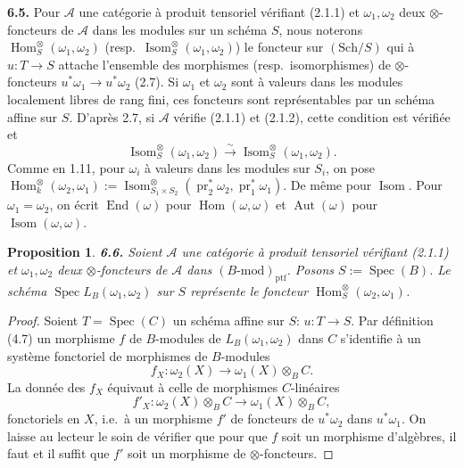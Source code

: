 \documentclass[12pt,a4paper]{article}
\theoremstyle{plain}
\newtheorem{proposition}[theorem]{Proposition}
\theoremstyle{definition}
\theoremstyle{remark}
\DeclareMathOperator{\Hom}{Hom}
\DeclareMathOperator{\End}{End}
\DeclareMathOperator{\Aut}{Aut}
\DeclareMathOperator{\Isom}{Isom}
\DeclareMathOperator{\Spec}{Spec}
\DeclareMathOperator{\pr}{pr}
\begin{document}
\textbf{6.5.} Pour $\mathcal{A}$ une catégorie à produit tensoriel vérifiant (2.1.1) et $\omega_1, \omega_2$ deux $\otimes$-foncteurs de $\mathcal{A}$ dans les modules sur un schéma $S$, nous noterons $\Hom^\otimes_S(\omega_1,\omega_2)$ (resp.~$\Isom^\otimes_S(\omega_1,\omega_2)$) le foncteur sur $(\mathrm{Sch}/S)$ qui à $u : T \to S$ attache l'ensemble des morphismes (resp.~isomorphismes) de $\otimes$-foncteurs $u^*\omega_1 \to u^*\omega_2$ (2.7). Si $\omega_1$ et $\omega_2$ sont à valeurs dans les modules localement libres de rang fini, ces foncteurs sont représentables par un schéma affine sur $S$. D'après 2.7, si $\mathcal{A}$ vérifie (2.1.1) et (2.1.2), cette condition est vérifiée et
\[
\Isom^\otimes_S(\omega_1,\omega_2) \xrightarrow{\sim} \Isom^\otimes_S(\omega_1,\omega_2).
\]
Comme en 1.11, pour $\omega_i$ à valeurs dans les modules sur $S_i$, on pose $\Hom^\otimes_k(\omega_2,\omega_1) := \Isom^\otimes_{S_1 \times S_2}(\pr_2^*\omega_2, \pr_1^*\omega_1)$. De même pour $\Isom$. Pour $\omega_1 = \omega_2$, on écrit $\End(\omega)$ pour $\Hom(\omega,\omega)$ et $\Aut(\omega)$ pour $\Isom(\omega,\omega)$.

\begin{proposition}\label{prop:6.6}
\textbf{6.6.} Soient $\mathcal{A}$ une catégorie à produit tensoriel vérifiant (2.1.1) et $\omega_1, \omega_2$ deux $\otimes$-foncteurs de $\mathcal{A}$ dans $(B\text{-mod})_\mathrm{ptf}$. Posons $S := \Spec(B)$. Le schéma $\Spec L_B(\omega_1,\omega_2)$ sur $S$ représente le foncteur $\Hom^\otimes_S(\omega_2,\omega_1)$.
\end{proposition}

\begin{proof}
Soient $T = \Spec(C)$ un schéma affine sur $S$: $u : T \to S$. Par définition (4.7) un morphisme $f$ de $B$-modules de $L_B(\omega_1,\omega_2)$ dans $C$ s'identifie à un système fonctoriel de morphismes de $B$-modules
\[
f_X : \omega_2(X) \to \omega_1(X) \otimes_B C.
\]
La donnée des $f_X$ équivaut à celle de morphismes $C$-linéaires
\[
f'_X : \omega_2(X) \otimes_B C \to \omega_1(X) \otimes_B C,
\]
fonctoriels en $X$, i.e.~à un morphisme $f'$ de foncteurs de $u^*\omega_2$ dans $u^*\omega_1$. On laisse au lecteur le soin de vérifier que pour que $f$ soit un morphisme d'algèbres, il faut et il suffit que $f'$ soit un morphisme de $\otimes$-foncteurs.
\end{proof}

\subsection{}
\end{document}

